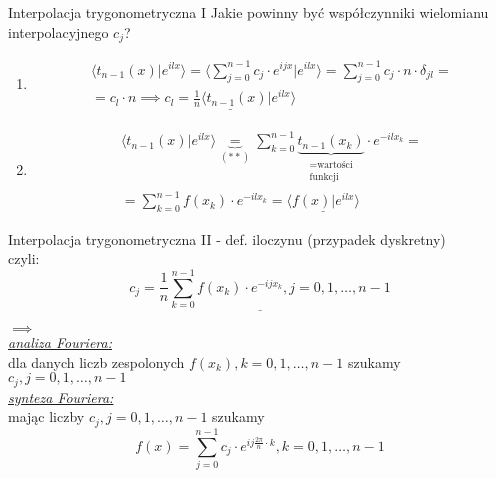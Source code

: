 \begin{frame}{Interpolacja trygonometryczna I}
	Jakie powinny być współczynniki wielomianu interpolacyjnego $c_j$?
	
	\begin{enumerate}[1$^\circ$]
		\item
		\begin{align*}
			\langle t_{n-1}(x)|e^{ilx} \rangle = \Bigg\langle \sum\limits_{j = 0}^{n-1} c_j \cdot e^{ijx} \Bigg|e^{ilx} \Bigg\rangle = \sum\limits_{j = 0}^{n-1} c_j \cdot n \cdot \delta_{jl} = \\ = c_l \cdot n \implies \underline{c_l = \frac{1}{n} \langle t_{n-1}(x)|e^{ilx} \rangle}
			\tag{16.20}
		\end{align*}
		\item
		\begin{align*}
			\langle t_{n-1}(x)|e^{ilx} \rangle \underbrace{=}_{(**)} \sum\limits_{k = 0}^{n-1}  \underbrace{t_{n-1}(x_k)}_{\substack{\text{=wartości} \\  \text{funkcji}}} \cdot e^{-ilx_k} = \\ = \sum\limits_{k = 0}^{n-1} f(x_k) \cdot e^{-ilx_k} = \underline{\langle f(x)|e^{ilx} \rangle}
		\end{align*}
	\end{enumerate}
\end{frame}
\begin{frame}{Interpolacja trygonometryczna II}	
	- def. iloczynu (przypadek dyskretny) \\
	czyli:
	\[
		\underline{c_j = \frac{1}{n} \sum\limits_{k = 0}^{n-1} f(x_k) \cdot e^{-ijx_k}, j = 0, 1, \dots, n-1}
		\tag{16.21}
	\]
	\begin{flushleft}
		$\implies$ \\
		\underline{\textit{analiza Fouriera:}} \\
		dla danych liczb zespolonych $f(x_k), k = 0, 1,\dots, n - 1$ szukamy $c_j, j = 0, 1, \dots, n-1$ \\
		\bigskip
		\underline{\textit{synteza Fouriera:}} \\
		mając liczby $c_j, j = 0, 1, \dots, n-1$ szukamy
		\[
			f(x) = \sum\limits_{j = 0}^{n - 1} c_j \cdot e^{ij\frac{2\pi}{n} \cdot k}, k = 0, 1, \dots, n-1
			\tag{16.22}
		\]
	\end{flushleft}
	\end{frame}
